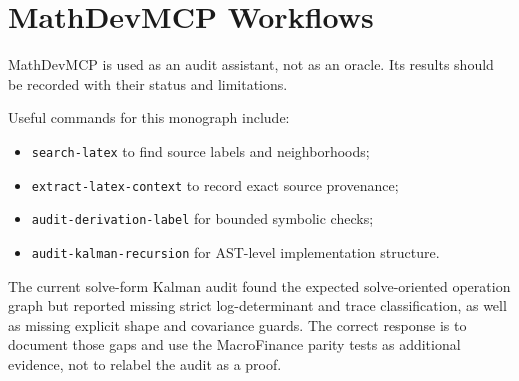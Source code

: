\chapter{MathDevMCP Workflows}
\label{app:bf-mathdevmcp-workflows}

MathDevMCP is used as an audit assistant, not as an oracle.  Its results should
be recorded with their status and limitations.

Useful commands for this monograph include:
\begin{itemize}
  \item \texttt{search-latex} to find source labels and neighborhoods;
  \item \texttt{extract-latex-context} to record exact source provenance;
  \item \texttt{audit-derivation-label} for bounded symbolic checks;
  \item \texttt{audit-kalman-recursion} for AST-level implementation structure.
\end{itemize}

The current solve-form Kalman audit found the expected solve-oriented operation
graph but reported missing strict log-determinant and trace classification, as
well as missing explicit shape and covariance guards.  The correct response is
to document those gaps and use the MacroFinance parity tests as additional
evidence, not to relabel the audit as a proof.
